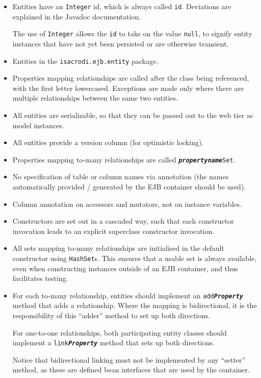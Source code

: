 \documentclass[a4paper,fleqn]{article}
\newcommand{\computercode}[1]{\texttt{#1}}
\newcommand{\computermeta}[1]{\texttt{\textbf{\textit{#1}}}}
\begin{document}
\begin{itemize}

\item Entities have an \computercode{Integer} id, which is always
  called \computercode{id}. Deviations are explained in the Javadoc
  documentation.

  The use of \computercode{Integer} allows
  the \computercode{id} to take on the value \computercode{null}, to
  signify entity instances that have not yet been persisted or are
  otherwise transient.

\item Entities in the \computercode{isacrodi.ejb.entity} package.

\item Properties mapping relationships are called after the class
  being referenced, with the first letter lowercased. Exceptions are
  made only where there are multiple relationships between the same
  two entities.

\item All entities are serializable, so that they can be passed out to the
  web tier as model instances.

\item All entities provide a version column (for optimistic locking).

\item Properties mapping to-many relationships are called
  \computercode{\computermeta{propertyname}Set}.

\item No specification of table or column names via annotation (the
  names automatically provided / generated by the EJB container should
  be used).

\item Column annotation on accessors and mutators, not on instance
  variables.

\item Constructors are set out in a cascaded way, such that each
  constructor invocation leads to an explicit superclass constructor
  invocation.

\item All sets mapping to-many relationships are initialised in the
  default constructor using \computercode{HashSet}s. This ensures that
  a usable set is always available, even when constructing instances
  outside of an EJB container, and thus facilitates testing.

\item For each to-many relationship, entities should implement an
  \computercode{add\computermeta{Property}} method that adds a
  relationship. Where the mapping is bidirectional, it is the
  responsibility of this ``adder'' method to set up both directions.

  For one-to-one relationships, both participating entity classes
  should implement a \computercode{link\computermeta{Property}} method
  that sets up both directions.

  Notice that bidirectional linking must not be implemented by any
  ``setter'' method, as these are defined bean interfaces that are
  used by the container.

\end{itemize}
\end{document}

